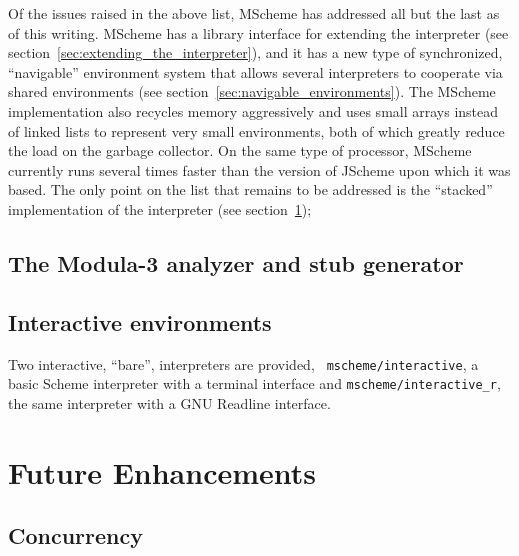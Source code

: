 Of the issues raised in the above list, MScheme has addressed all but
the last as of this writing.  MScheme has a library interface for
extending the interpreter (see
section~\ref{sec:extending_the_interpreter}), and it has a new type of
synchronized, ``navigable'' environment system that allows several
interpreters to cooperate via shared environments (see
section~\ref{sec:navigable_environments}). The MScheme implementation
also recycles memory aggressively and uses small arrays instead of
linked lists to represent very small environments, both of which
greatly reduce the load on the garbage collector.  On the same type of
processor, MScheme currently runs several times faster than the version
of JScheme upon which it was based.  The only point on the list that 
remains to be addressed is the ``stacked'' implementation of the interpreter
(see section~\ref{sec:future_enhancements});

\subsection{The Modula-3 analyzer and stub generator}\label{sec:stub_generator}

\subsection{Interactive environments}

Two interactive, ``bare'', interpreters are provided, {\tt
  mscheme/interactive}, a basic Scheme interpreter with a terminal
interface and {\tt mscheme/interactive\_r}, the same interpreter with a
GNU Readline interface.


\section{Future Enhancements}\label{sec:future_enhancements}

\subsection{Concurrency}

